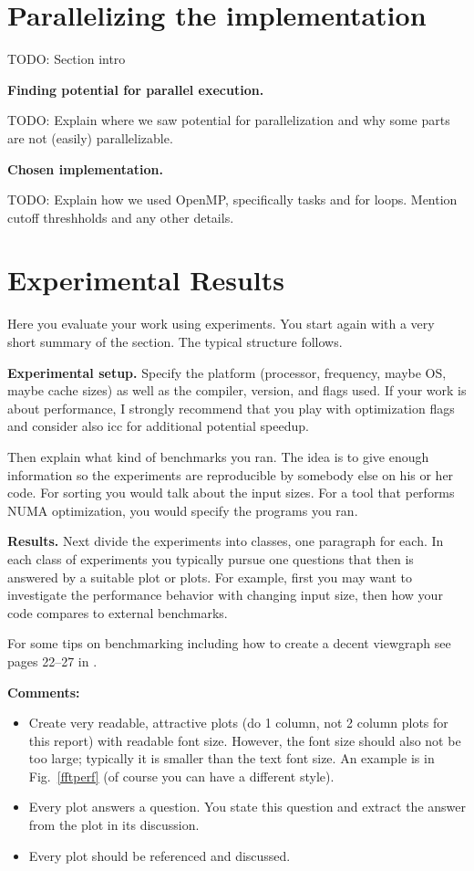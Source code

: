\documentclass[letterpaper]{article}
\newcommand{\mypar}[1]{{\bf #1.}}
\begin{document}
\section{Parallelizing the implementation}\label{sec:yourmethod}

TODO: Section intro

\mypar{Finding potential for parallel execution}

TODO: Explain where we saw potential for parallelization and why some parts are not (easily) parallelizable.

\mypar{Chosen implementation}

TODO: Explain how we used OpenMP, specifically tasks and for loops. Mention cutoff threshholds and any other details.

\section{Experimental Results}\label{sec:exp}

Here you evaluate your work using experiments. You start again with a
very short summary of the section. The typical structure follows.

\mypar{Experimental setup} Specify the platform (processor, frequency, maybe OS, maybe cache sizes)
as well as the compiler, version, and flags used. If your work is about performance, 
I strongly recommend that you play with optimization flags and consider also icc for additional potential speedup.

Then explain what kind of benchmarks you ran. The idea is to give enough information so the experiments are reproducible by somebody else on his or her code.
For sorting you would talk about the input sizes. For a tool that performs NUMA optimization, you would specify the programs you ran.

\mypar{Results}
Next divide the experiments into classes, one paragraph for each. In each class of experiments you typically pursue one questions that then is answered by a suitable plot or plots. For example, first you may want to investigate the performance behavior with changing input size, then how your code compares to external benchmarks.

For some tips on benchmarking including how to create a decent viewgraph see pages 22--27 in \cite{Pueschel:10}.

{\bf Comments:}
\begin{itemize}
\item Create very readable, attractive plots (do 1 column, not 2 column plots
for this report) with readable font size. However, the font size should also not be too large; typically it is smaller than the text font size.
An example is in Fig.~\ref{fftperf} (of course you can have a different style).
\item Every plot answers a question. You state this question and extract the
answer from the plot in its discussion.
\item Every plot should be referenced and discussed.
\end{itemize}
\end{document}
